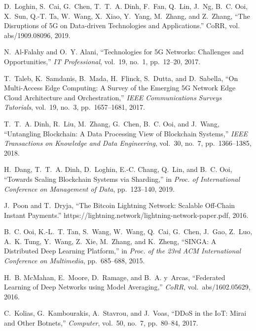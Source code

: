 \documentclass[11pt]{article}
\begin{document}

\vspace{-8pt}
\begin{thebibliography}{10}
\itemsep=1pt
\begin{small} 

 D.~Loghin, S.~Cai, G.~Chen, T.~T.~A. Dinh,
  F.~Fan, Q.~Lin, J.~Ng, B.~C. Ooi, X.~Sun, Q.-T. Ta, W.~Wang,
  X.~Xiao, Y.~Yang, M.~Zhang, and Z.~Zhang, ``{The Disruptions of 5G
    on Data-driven Technologies and Applications}.'' CoRR,
  vol. abs/1909.08096, 2019.

N.~{Al-Falahy} and O.~Y. {Alani}, ``{Technologies for 5G Networks: Challenges
  and Opportunities},'' {\em IT Professional}, vol.~19, no.~1, pp.~12--20,
  2017.

T.~{Taleb}, K.~{Samdanis}, B.~{Mada}, H.~{Flinck}, S.~{Dutta}, and
  D.~{Sabella}, ``{On Multi-Access Edge Computing: A Survey of the Emerging 5G
  Network Edge Cloud Architecture and Orchestration},'' {\em IEEE
  Communications Surveys Tutorials}, vol.~19, no.~3, pp.~1657--1681, 2017.

T.~T.~A. {Dinh}, R.~{Liu}, M.~{Zhang}, G.~{Chen}, B.~C. {Ooi}, and J.~{Wang},
  ``{Untangling Blockchain: A Data Processing View of Blockchain Systems},''
  {\em IEEE Transactions on Knowledge and Data Engineering}, vol.~30, no.~7,
  pp.~1366--1385, 2018.

H.~Dang, T.~T.~A. Dinh, D.~Loghin, E.-C. Chang, Q.~Lin, and B.~C. Ooi,
  ``{Towards Scaling Blockchain Systems via Sharding},'' in {\em Proc. of
  International Conference on Management of Data}, pp.~123--140, 2019.

J.~Poon and T.~Dryja, ``{The Bitcoin Lightning Network: Scalable Off-Chain
  Instant Payments}.'' https://lightning.network/lightning-network-paper.pdf,
  2016.

B.~C. Ooi, K.-L.~T. Tan, S.~Wang, W.~Wang, Q.~Cai, G.~Chen, J.~Gao, Z.~Luo,
  A.~K. Tung, Y.~Wang, Z.~Xie, M.~Zhang, and K.~Zheng, ``{SINGA: A Distributed
  Deep Learning Platform},'' in {\em Proc. of the 23rd ACM International
  Conference on Multimedia}, pp.~685--688, 2015.

H.~B. McMahan, E.~Moore, D.~Ramage, and B.~A. y~Arcas, ``{Federated Learning of
  Deep Networks using Model Averaging},'' {\em CoRR}, vol.~abs/1602.05629,
  2016.

C.~{Kolias}, G.~{Kambourakis}, A.~{Stavrou}, and J.~{Voas}, ``{DDoS in the IoT:
  Mirai and Other Botnets},'' {\em Computer}, vol.~50, no.~7, pp.~80--84, 2017.

\end{small}
\end{thebibliography}
\end{document}
